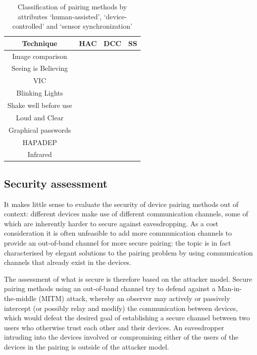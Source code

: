 \documentclass[conference, 11pt]{sty/IEEEtran}
\begin{document}
\begin{table}[h]
    \centering
    \normalsize{
\begin{tabular}{c|c|c|c}
	Technique & HAC & DCC & SS \\
	\hline
	Image comparison & \checkmark &  & \\
	  Seeing is Believing &  & \checkmark &   \\
	   VIC & & \checkmark  & \\
	   Blinking Lights & \checkmark &  & \\
	Shake well before use &  &  & \checkmark \\
	       Loud and Clear & \checkmark & \checkmark & \\
    	  Graphical passwords & \checkmark &  &  \\
	 HAPADEP &  & \checkmark & \checkmark \\
	Infrared &  & \checkmark &  \\
\end{tabular}
    }
    \label{fig:classification}
    \caption{Classification of pairing methods by attributes `human-assisted', `device-controlled' and `sensor synchronization'}
\end{table}

\subsection{Security assessment}
\label{ssec:security_assessment}

It makes little sense to evaluate the security of device pairing methods out of context: different devices make use of different communication channels, some of which are inherently harder to secure against eavesdropping.
As a cost consideration it is often unfeasible to add more communication channels to provide an out-of-band channel for more secure pairing: the topic is in fact characterised by elegant solutions to the pairing problem by using communication channels that already exist in the devices.

The assessment of what is secure is therefore based on the attacker model.
Secure pairing methods using an out-of-band channel try to defend against a Man-in-the-middle (MITM) attack, whereby an observer may actively or passively intercept (or possibly relay and modify) the communication between devices, which would defeat the desired goal of establishing a secure channel between two users who otherwise trust each other and their devices.
An eavesdropper intruding into the devices involved or compromising either of the users of the devices in the pairing is outside of the attacker model.
\end{document}

